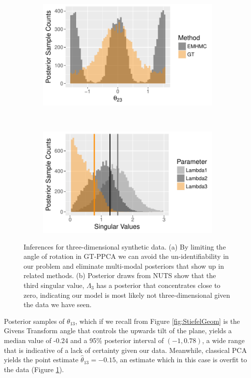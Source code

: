\documentclass{article}
\begin{document}
\begin{figure}
    \centering
    \begin{subfigure}[b]{0.38\textwidth}
        \includegraphics[width=\textwidth]{multiModal.pdf}
        \caption{}
        \label{fig:multiModal}
    \end{subfigure}
    ~ %
    \begin{subfigure}[b]{0.38\textwidth}
        \includegraphics[width=\textwidth]{syntheticLambdaPosterior.pdf}
        \caption{}
        \label{fig:SyntheticPosteriorEstimates}
    \end{subfigure}
    \caption{Inferences for three-dimensional synthetic data. (a) By limiting the angle of rotation in GT-PPCA we can avoid the un-identifiability in our problem and eliminate multi-modal posteriors that show up in related methods. (b) Posterior draws from NUTS show that the third singular value, $\Lambda_3$ has a posterior that concentrates close to zero, indicating our model is most likely not three-dimensional given the data we have seen.}
\end{figure}
Posterior samples of $\theta_{13}$, which if we recall from Figure \ref{fig:StiefelGeom} is the Givens Transform angle that controls the upwards tilt of the plane, yields a median value of -0.24 and a 95\% posterior interval of $(-1, 0.78)$, a wide range that is indicative of a lack of certainty given our data. Meanwhile, classical PCA yields the point estimate $\hat{\theta}_{13} = -0.15$, an estimate which in this case is overfit to the data (Figure \ref{fig:multiModal}). 
\end{document}
